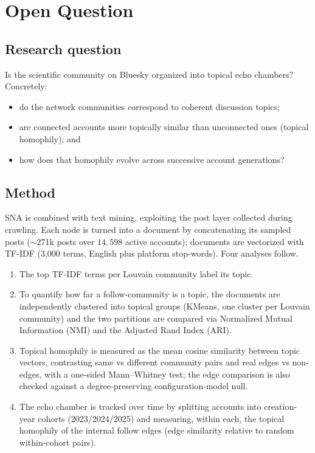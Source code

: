 \section{Open Question}
\label{sec:open}
\subsection{Research question}
Is the scientific community on Bluesky organized into topical echo chambers? Concretely:
\begin{itemize}\itemsep0pt
    \item do the network communities correspond to coherent discussion topics;
    \item are connected accounts more topically similar than unconnected ones (topical homophily); and
    \item how does that homophily evolve across successive account generations?
\end{itemize}

\subsection{Method}
SNA is combined with text mining, exploiting the post layer collected during crawling. Each node is turned into a document by concatenating its sampled posts ($\sim$271k posts over $14{,}598$ active accounts); documents are vectorized with TF-IDF (3{,}000 terms, English plus platform stop-words). Four analyses follow.
\begin{enumerate}
\item The top TF-IDF terms per Louvain community label its topic. \item To quantify how far a follow-community is a topic, the documents are independently clustered into topical groups (KMeans, one cluster per Louvain community) and the two partitions are compared via Normalized Mutual Information (NMI) and the Adjusted Rand Index (ARI).
\item Topical homophily is measured as the mean cosine similarity between topic vectors, contrasting same vs different community pairs and real edges vs non-edges, with a one-sided Mann--Whitney test; the edge comparison is also checked against a degree-preserving configuration-model null.
\item The echo chamber is tracked over time by splitting accounts into creation-year cohorts (2023/2024/2025) and measuring, within each, the topical homophily of the internal follow edges (edge similarity relative to random within-cohort pairs).
\end{enumerate}

